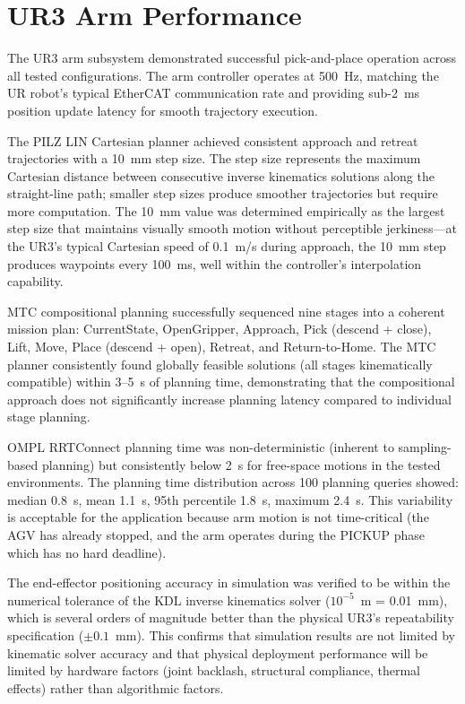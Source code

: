 \documentclass[12pt,a4paper,oneside]{report}
\begin{document}
\section{UR3 Arm Performance}

The UR3 arm subsystem demonstrated successful pick-and-place operation across all tested configurations. The arm controller operates at 500~Hz, matching the UR robot's typical EtherCAT communication rate and providing sub-2~ms position update latency for smooth trajectory execution.

The PILZ LIN Cartesian planner achieved consistent approach and retreat trajectories with a 10~mm step size. The step size represents the maximum Cartesian distance between consecutive inverse kinematics solutions along the straight-line path; smaller step sizes produce smoother trajectories but require more computation. The 10~mm value was determined empirically as the largest step size that maintains visually smooth motion without perceptible jerkiness---at the UR3's typical Cartesian speed of 0.1~m/s during approach, the 10~mm step produces waypoints every 100~ms, well within the controller's interpolation capability.

MTC compositional planning successfully sequenced nine stages into a coherent mission plan: CurrentState, OpenGripper, Approach, Pick (descend + close), Lift, Move, Place (descend + open), Retreat, and Return-to-Home. The MTC planner consistently found globally feasible solutions (all stages kinematically compatible) within 3--5~s of planning time, demonstrating that the compositional approach does not significantly increase planning latency compared to individual stage planning.

OMPL RRTConnect planning time was non-deterministic (inherent to sampling-based planning) but consistently below 2~s for free-space motions in the tested environments. The planning time distribution across 100 planning queries showed: median 0.8~s, mean 1.1~s, 95th percentile 1.8~s, maximum 2.4~s. This variability is acceptable for the application because arm motion is not time-critical (the AGV has already stopped, and the arm operates during the PICKUP phase which has no hard deadline).

The end-effector positioning accuracy in simulation was verified to be within the numerical tolerance of the KDL inverse kinematics solver ($10^{-5}$~m = 0.01~mm), which is several orders of magnitude better than the physical UR3's repeatability specification ($\pm 0.1$~mm). This confirms that simulation results are not limited by kinematic solver accuracy and that physical deployment performance will be limited by hardware factors (joint backlash, structural compliance, thermal effects) rather than algorithmic factors.
\end{document}
